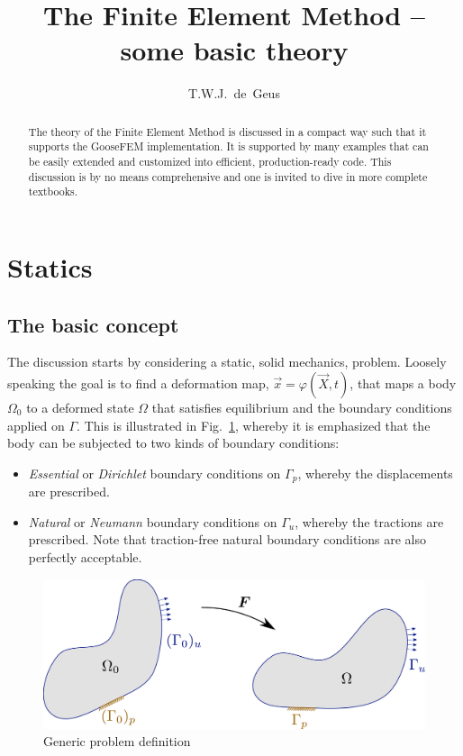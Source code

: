 \documentclass[times,namecite]{goose-article}
\title{%
  The Finite Element Method -- some basic theory
}
\author{T.W.J.~de~Geus}
\begin{document}
\maketitle

\begin{abstract}
The theory of the Finite Element Method is discussed in a compact way such that it supports the GooseFEM implementation. It is supported by many examples that can be easily extended and customized into efficient, production-ready code. This discussion is by no means comprehensive and one is invited to dive in more complete textbooks.
\end{abstract}

\tableofcontents

\section{Statics}

\subsection{The basic concept}

The discussion starts by considering a static, solid mechanics, problem. Loosely speaking the goal is to find a deformation map, $\vec{x} = \varphi(\vec{X},t)$, that maps a body $\Omega_0$ to a deformed state $\Omega$ that satisfies equilibrium and the boundary conditions applied on $\Gamma$. This is illustrated in Fig.~\ref{fig:problem}, whereby it is emphasized that the body can be subjected to two kinds of boundary conditions:
\begin{itemize}
  \item \emph{Essential} or \emph{Dirichlet} boundary conditions on $\Gamma_p$, whereby the displacements are prescribed.
  \item \emph{Natural} or \emph{Neumann} boundary conditions on $\Gamma_u$, whereby the tractions are prescribed. Note that traction-free natural boundary conditions are also perfectly acceptable.
\end{itemize}

\begin{figure}[htp]
  \centering
  \includegraphics[width=.5\textwidth]{figures/problem.pdf}
  \caption{Generic problem definition}
  \label{fig:problem}
\end{figure}
\end{document}
